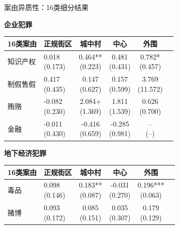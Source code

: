 \documentclass[aspectratio=169,10pt]{ctexbeamer}
\begin{document}
\begin{frame}[plain]{案由异质性：16类细分结果}
  \begin{minipage}[t]{0.48\textwidth}
    \centering
    \textbf{企业犯罪}
    \vspace{0.25em}
    \begin{tabular}{llcccc}
      \toprule
      16类案由 & 正规街区 & 城中村 & 中心 & 外围 \\
      \midrule
      知识产权 & \makecell{0.018\\(0.173)} & \makecell{0.464**\\(0.223)} & \makecell{0.481\\(0.431)} & \makecell{0.782*\\(0.457)} \\
      制假售假 & \makecell{0.417\\(0.435)} & \makecell{0.147\\(0.627)} & \makecell{0.157\\(0.599)} & \makecell{3.769\\(11.572)} \\
      贿赂 & \makecell{-0.082\\(0.230)} & \makecell{2.084+\\(1.369)} & \makecell{1.811\\(1.539)} & \makecell{0.626\\(0.700)} \\
      金融 & \makecell{-0.011\\(0.430)} & \makecell{-0.416\\(0.659)} & \makecell{-0.285\\(0.981)} & \makecell{--\\(--)} \\
      \bottomrule
    \end{tabular}
  \end{minipage}
  \hfill
  \begin{minipage}[t]{0.48\textwidth}
    \centering
    \textbf{地下经济犯罪}
    \vspace{0.25em}
    \begin{tabular}{llcccc}
      \toprule
      16类案由 & 正规街区 & 城中村 & 中心 & 外围 \\
      \midrule
      毒品 & \makecell{0.098\\(0.146)} & \makecell{0.183**\\(0.087)} & \makecell{-0.031\\(0.270)} & \makecell{0.196***\\(0.063)} \\
      赌博 & \makecell{0.093\\(0.172)} & \makecell{0.085\\(0.151)} & \makecell{0.035\\(0.307)} & \makecell{0.179\\(0.129)} \\

\end{tabular}
\end{minipage}
\end{frame}
\end{document}
